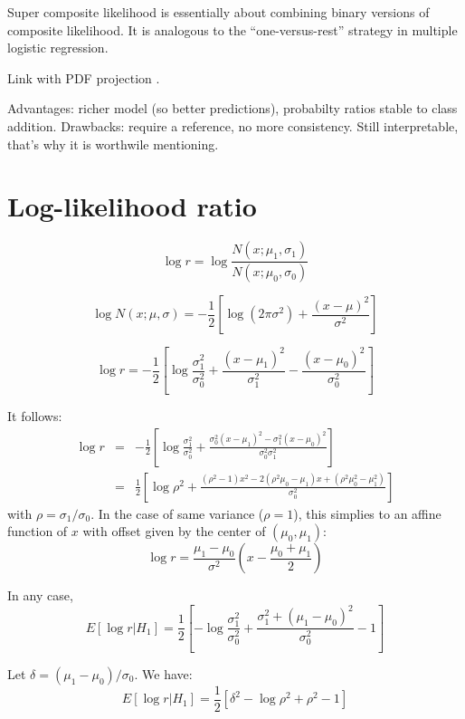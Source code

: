 \documentclass[english]{scrartcl}
\begin{document}
Super composite likelihood is essentially about combining binary versions of composite likelihood. It is analogous to the ``one-versus-rest'' strategy in multiple logistic regression. 

Link with PDF projection \cite{Baggenstoss-03}.

Advantages: richer model (so better predictions), probabilty ratios stable to class addition. Drawbacks: require a reference, no more consistency. Still interpretable, that's why it is worthwile mentioning.



\section{Log-likelihood ratio}

$$
\log r = \log \frac{N(x;\mu_1,\sigma_1)}{N(x;\mu_0,\sigma_0)}
$$

$$
\log N(x;\mu,\sigma) = -\frac{1}{2}\left[
\log(2\pi\sigma^2) + \frac{(x-\mu)^2}{\sigma^2}
\right]
$$

$$
\log r = -\frac{1}{2}
\left[
\log \frac{\sigma_1^2}{\sigma_0^2}
+ \frac{(x-\mu_1)^2}{\sigma_1^2} - \frac{(x-\mu_0)^2}{\sigma_0^2}
\right]
$$

It follows:
\begin{eqnarray*}
\log r 
 & = & 
-\frac{1}{2}\left[
\log \frac{\sigma_1^2}{\sigma_0^2}
+ \frac{\sigma_0^2(x-\mu_1)^2 - \sigma_1^2(x-\mu_0)^2}{\sigma_0^2 \sigma_1^2}
\right] \\
 & = & 
\frac{1}{2}\left[
\log \rho^2
+ \frac{(\rho^2-1)x^2 - 2(\rho^2\mu_0-\mu_1)x+ (\rho^2\mu_0 ^2-\mu_1^2)}{\sigma_0^2}
\right]
\end{eqnarray*}
with $\rho=\sigma_1/\sigma_0$. In the case of same variance ($\rho=1$), this simplies to an affine function of $x$ with offset given by the center of $(\mu_0,\mu_1)$:
$$
\log r = \frac{\mu_1-\mu_0}{\sigma^2} \left(
x - \frac{\mu_0 + \mu_1}{2}
\right) 
$$

In any case,
$$
E[\log r | H_1] = 
\frac{1}{2}
\left[
- \log \frac{\sigma_1^2}{\sigma_0^2}
+ \frac{\sigma_1^2 + (\mu_1-\mu_0)^2}{\sigma_0^2}
- 1
\right]
$$

Let $\delta = (\mu_1-\mu_0)/\sigma_0$. We have:
$$
E[\log r | H_1] = 
\frac{1}{2}
\left[
\delta^2
- \log \rho^2
+ \rho^2  - 1
\right]
$$







\end{document}
